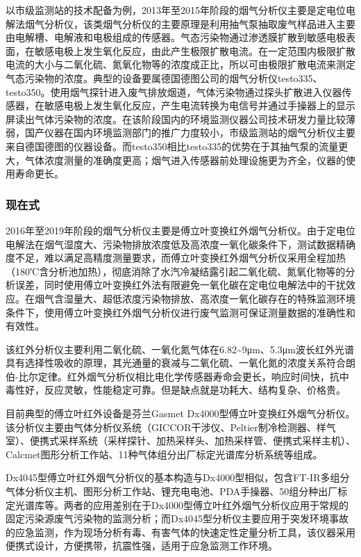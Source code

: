 \documentclass[]{book}
\begin{document}
以市级监测站的技术配备为例，2013年至2015年阶段的烟气分析仪主要是定电位电解法烟气分析仪，该类烟气分析仪的主要原理是利用抽气泵抽取废气样品进入主要由电解槽、电解液和电极组成的传感器。气态污染物通过渗透膜扩散到敏感电极表面，在敏感电极上发生氧化反应，由此产生极限扩散电流。在一定范围内极限扩散电流的大小与二氧化硫、氮氧化物等的浓度成正比，所以可由极限扩散电流来测定气态污染物的浓度。典型的设备要属德国德图公司的烟气分析仪testo335、testo350。使用烟气探针进入废气排放烟道，气体污染物通过探头扩散进入仪器传感器，在敏感电极上发生氧化反应，产生电流转换为电信号并通过手操器上的显示屏读出气体污染物的浓度。在该阶段国内的环境监测仪器公司技术研发力量比较薄弱，国产仪器在国内环境监测部门的推广力度较小，市级监测站的烟气分析仪主要来自德国德图的仪器设备。而testo350相比testo335的优势在于其抽气泵的流量更大，气体浓度测量的准确度更高；烟气进入传感器前处理设施更为齐全，仪器的使用寿命更长。

\hypertarget{ux73b0ux5728ux5f0f}{%
\subsubsection{现在式}\label{ux73b0ux5728ux5f0f}}

2016年至2019年阶段的烟气分析仪主要是傅立叶变换红外烟气分析仪。由于定电位电解法在烟气湿度大、污染物排放浓度低及高浓度一氧化碳条件下，测试数据精确度不足，难以满足高精度测量要求，而傅立叶变换红外烟气分析仪采用全程加热（180℃含分析池加热），彻底消除了水汽冷凝结露引起二氧化硫、氮氧化物等的分析误差，同时使用傅立叶变换红外法有限避免一氧化碳在定电位电解法中的干扰效应。在烟气含湿量大、超低浓度污染物排放、高浓度一氧化碳存在的特殊监测环境条件下，使用傅立叶变换红外烟气分析仪进行废气监测可保证测量数据的准确性和有效性。

该红外分析仪主要利用二氧化硫、一氧化氮气体在6.82\textasciitilde{}9μm、5.3μm波长红外光谱具有选择性吸收的原理，其光通量的衰减与二氧化硫、一氧化氮的浓度关系符合朗伯-比尔定律。红外烟气分析仪相比电化学传感器寿命会更长，响应时间快，抗中毒性好，反应灵敏，性能稳定可靠。但是缺点就是功耗大、结构复杂、价格贵。

目前典型的傅立叶红外设备是芬兰Gasmet Dx4000型傅立叶变换红外烟气分析仪。该分析仪主要由气体分析仪系统（GICCOR干涉仪、Peltier制冷检测器、样气室）、便携式采样系统（采样探针、加热采样头、加热采样管、便携式采样主机）、Calcmet图形分析工作站、11种气体组分出厂标定光谱库分析系统等组成。

Dx4045型傅立叶红外烟气分析仪的基本构造与Dx4000型相似，包含FT-IR多组分气体分析仪主机、图形分析工作站、锂充电电池、PDA手操器、50组分种出厂标定光谱库等。两者的应用差别在于Dx4000型傅立叶红外烟气分析仪应用于常规的固定污染源废气污染物的监测分析；而Dx4045型分析仪主要应用于突发环境事故的应急监测，作为现场分析有毒、有害气体的快速定性定量分析工具，该仪器采用便携式设计，方便携带，抗震性强，适用于应急监测工作环境。
\end{document}
